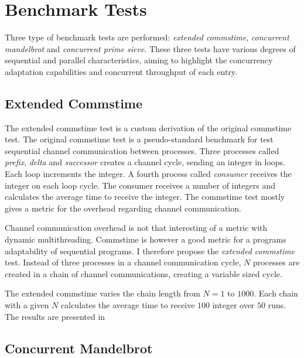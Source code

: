 \section{Benchmark Tests}
\label{sec:benchmark_tests}

Three type of benchmark tests are performed: \textit{extended commstime}, \textit{concurrent mandelbrot} and \textit{concurrent prime sieve}. These three tests have various degrees of sequential and parallel characteristics, aiming to highlight the concurrency adaptation capabilities and concurrent throughput of each entry.


\subsection{Extended Commstime}

The extended commstime test is a custom derivation of the original commstime test. The original commstime test \citep{roger2001commstime} is a pseudo\hyp{}standard benchmark for test sequential channel communication between processes. Three processes called \textit{prefix}, \textit{delta} and \textit{successor} creates a channel cycle, sending an integer in loops. Each loop increments the integer. A fourth process called \textit{consumer} receives the integer on each loop cycle. The consumer receives a number of integers and calculates the average time to receive the integer. The commstime test mostly gives a metric for the overhead regarding channel communication.

Channel communication overhead is not that interesting of a metric with dynamic multithreading. Commstime is however a good metric for a programs adaptability of sequential programs. I therefore propose the \textit{extended commstime} test. Instead of three processes in a channel communication cycle, $N$ processes are created in a chain of channel communications, creating a variable sized cycle.

The extended commstime varies the chain length from $N=1$ to $1000$. Each chain with a given $N$ calculates the average time to receive $100$ integer over $50$ runs. The results are presented in 


\subsection{Concurrent Mandelbrot}

